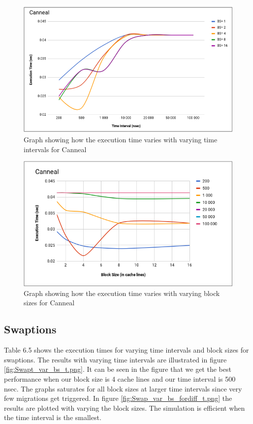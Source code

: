 \documentclass{listhesis}
\begin{document}
\begin{figure}
  \includegraphics[width=\linewidth]{cann_var_bs_t.png}
  \centering
  \caption{Graph showing how the execution time varies with varying time intervals for Canneal}
  \label{fig:cann_var_bs_t.png}
\end{figure}

\begin{figure}
  \includegraphics[width=\linewidth]{Cann_var_bs_fordiff_t.png}
  \centering
  \caption{Graph showing how the execution time varies with varying block sizes for Canneal}
  \label{fig:Cann_var_bs_fordiff_t.png}
\end{figure}

\subsection{Swaptions}
Table 6.5 shows the execution times for varying time intervals and block sizes for swaptions. The results with varying time intervals are illustrated in figure \ref{fig:Swapt_var_bs_t.png}. It can be seen in the figure that we get the best performance when our block size is 4 cache lines and our time interval is 500 nsec. The graphs saturates for all block sizes at larger time intervals since very few migrations get triggered. In figure \ref{fig:Swap_var_bs_fordiff_t.png} the results are plotted with varying the block sizes. The simulation is efficient when the time interval is the smallest.
\end{document}
